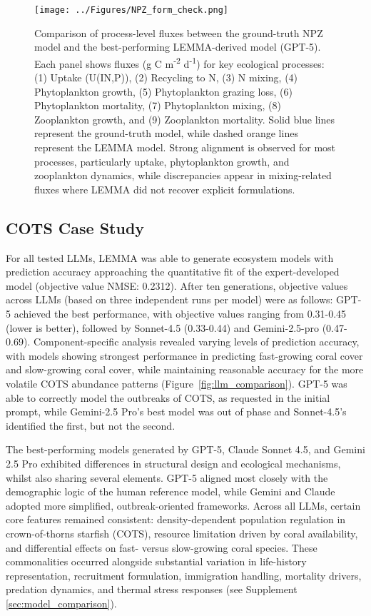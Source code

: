 \begin{figure}[H]
\centering
\texttt{[image: ../Figures/NPZ\_form\_check.png]}
\caption{Comparison of process-level fluxes between the ground-truth NPZ model and the best-performing LEMMA-derived model (GPT-5). Each panel shows fluxes (g C m\textsuperscript{-2} d\textsuperscript{-1}) for key ecological processes: (1) Uptake (U(IN,P)), (2) Recycling to N, (3) N mixing, (4) Phytoplankton growth, (5) Phytoplankton grazing loss, (6) Phytoplankton mortality, (7) Phytoplankton mixing, (8) Zooplankton growth, and (9) Zooplankton mortality. Solid blue lines represent the ground-truth model, while dashed orange lines represent the LEMMA model. Strong alignment is observed for most processes, particularly uptake, phytoplankton growth, and zooplankton dynamics, while discrepancies appear in mixing-related fluxes where LEMMA did not recover explicit formulations.}
\label{fig:npz_flux_comparison}
\end{figure}


\subsection{COTS Case Study}
\label{sec:cots_data}
For all tested LLMs, LEMMA was able to generate ecosystem models with prediction accuracy approaching the quantitative fit of the expert-developed model (objective value NMSE: 0.2312). After ten generations, objective values across LLMs (based on three independent runs per model) were as follows: GPT-5 achieved the best performance, with objective values ranging from 0.31-0.45 (lower is better), followed by Sonnet-4.5 (0.33-0.44) and Gemini-2.5-pro (0.47-0.69). Component-specific analysis revealed varying levels of prediction accuracy, with models showing strongest performance in predicting fast-growing coral cover and slow-growing coral cover, while maintaining reasonable accuracy for the more volatile COTS abundance patterns (Figure~\ref{fig:llm_comparison}). GPT-5 was able to correctly model the outbreaks of COTS, as requested in the initial prompt, while Gemini-2.5 Pro's best model was out of phase and Sonnet-4.5's identified the first, but not the second. 

The best-performing models generated by GPT-5, Claude Sonnet 4.5, and Gemini 2.5 Pro exhibited differences in structural design and ecological mechanisms, whilst also sharing several elements. GPT-5 aligned most closely with the demographic logic of the human reference model, while Gemini and Claude adopted more simplified, outbreak-oriented frameworks. Across all LLMs, certain core features remained consistent: density-dependent population regulation in crown-of-thorns starfish (COTS), resource limitation driven by coral availability, and differential effects on fast- versus slow-growing coral species. These commonalities occurred alongside substantial variation in life-history representation, recruitment formulation, immigration handling, mortality drivers, predation dynamics, and thermal stress responses (see Supplement \ref{sec:model_comparison}).

